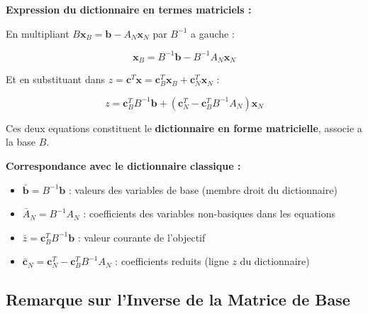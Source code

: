 \documentclass[12pt,a4paper]{article}
\begin{document}
\begin{methode}
\textbf{Expression du dictionnaire en termes matriciels :}

En multipliant $B\mathbf{x}_B = \mathbf{b} - A_N\mathbf{x}_N$ par $B^{-1}$ a gauche :

$$\boxed{\mathbf{x}_B = B^{-1}\mathbf{b} - B^{-1}A_N\mathbf{x}_N}$$

Et en substituant dans $z = \mathbf{c}^T\mathbf{x} = \mathbf{c}_B^T\mathbf{x}_B + \mathbf{c}_N^T\mathbf{x}_N$ :

$$\boxed{z = \mathbf{c}_B^T B^{-1}\mathbf{b} + (\mathbf{c}_N^T - \mathbf{c}_B^T B^{-1}A_N)\mathbf{x}_N}$$

Ces deux equations constituent le \textcolor{algoviolet}{\textbf{dictionnaire en forme matricielle}}, associe a la base $B$.
\end{methode}

\begin{astuce}
\textbf{Correspondance avec le dictionnaire classique :}

\begin{itemize}
    \item $\bar{\mathbf{b}} = B^{-1}\mathbf{b}$ : valeurs des variables de base (membre droit du dictionnaire)
    \item $\bar{A}_N = B^{-1}A_N$ : coefficients des variables non-basiques dans les equations
    \item $\bar{z} = \mathbf{c}_B^T B^{-1}\mathbf{b}$ : valeur courante de l'objectif
    \item $\bar{\mathbf{c}}_N = \mathbf{c}_N^T - \mathbf{c}_B^T B^{-1}A_N$ : coefficients reduits (ligne $z$ du dictionnaire)
\end{itemize}
\end{astuce}

\newpage
\subsection{Remarque sur l'Inverse de la Matrice de Base}
\end{document}

